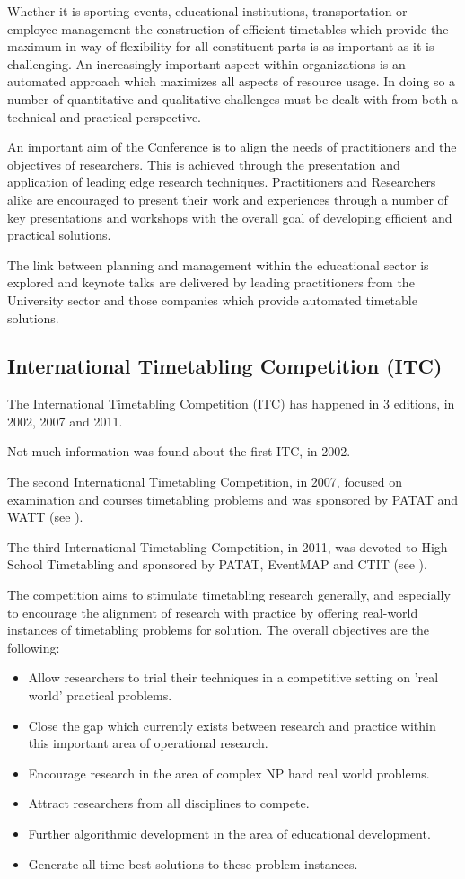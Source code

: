 Whether it is sporting events, educational institutions, transportation or employee management the construction of efficient timetables which provide the maximum in way of flexibility for all constituent parts is as important as it is challenging. An increasingly important aspect within organizations is an automated approach which maximizes all aspects of resource usage. In doing so a number of quantitative and qualitative challenges must be dealt with from both a technical and practical perspective.

An important aim of the Conference is to align the needs of practitioners and the objectives of researchers. This is achieved through the presentation and application of leading edge research techniques. Practitioners and Researchers alike are encouraged to present their work and experiences through a number of key presentations and workshops with the overall goal of developing efficient and practical solutions.

The link between planning and management within the educational sector is explored and keynote talks are delivered by leading practitioners from the University sector and those companies which provide automated timetable solutions.


\subsection{International Timetabling Competition (ITC)}
\label{itc}
The International Timetabling Competition (ITC) has happened in 3 editions, in 2002, 2007 and 2011.

Not much information was found about the first ITC, in 2002.

The second International Timetabling Competition, in 2007, focused on examination and courses timetabling problems and was sponsored by PATAT and WATT (see \cite{ITC2007}).

The third International Timetabling Competition, in 2011, was devoted to High School Timetabling and sponsored by PATAT, EventMAP and CTIT (see \cite{ITC2011}).

The competition aims to stimulate timetabling research generally, and especially to encourage the alignment of research with practice by offering real-world instances of timetabling problems for solution. The overall objectives are the following:
\begin{itemize}
\item Allow researchers to trial their techniques in a competitive setting on 'real world' practical problems.
\item Close the gap which currently exists between research and practice within this important area of operational research.
\item Encourage research in the area of complex NP hard real world problems.
\item Attract researchers from all disciplines to compete.
\item Further algorithmic development in the area of educational development.
\item Generate all-time best solutions to these problem instances.
\end{itemize}

